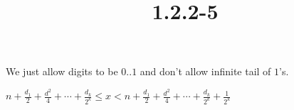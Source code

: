 \documentclass{article}
\title{1.2.2-5}
\begin{document}
\maketitle

We just allow digits to be \( 0..1 \) and don't allow infinite tail of \( 1 \)'s.

\( n + \frac{d_1}{2} + \frac{d^2}{4} + \cdots + \frac{d_k}{2^k} \leq x < n + \frac{d_1}{2} + \frac{d^2}{4} + \cdots + \frac{d_k}{2^k} + \frac{1}{2^k} \)
\end{document}
